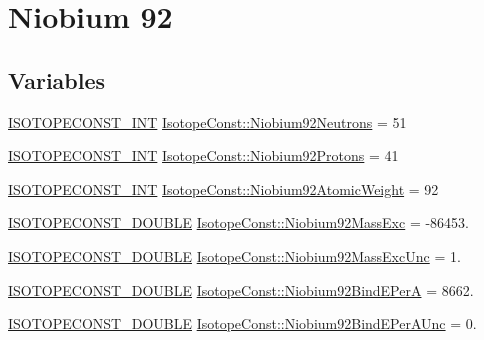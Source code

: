 \hypertarget{group___isotope_const-_niobium-_nb92}{}\section{Niobium 92}
\label{group___isotope_const-_niobium-_nb92}
\subsection*{Variables}
\begin{DoxyCompactItemize}
\item 
\mbox{\hyperlink{group___isotope_const-_macros_ga5f18360b3e99483a35c32d789e62621c}{I\+S\+O\+T\+O\+P\+E\+C\+O\+N\+S\+T\+\_\+\+I\+NT}} \mbox{\hyperlink{group___isotope_const-_niobium-_nb92_gae823fd6b9aed5c06fe87b787a26ea5b3}{Isotope\+Const\+::\+Niobium92\+Neutrons}} = 51
\item 
\mbox{\hyperlink{group___isotope_const-_macros_ga5f18360b3e99483a35c32d789e62621c}{I\+S\+O\+T\+O\+P\+E\+C\+O\+N\+S\+T\+\_\+\+I\+NT}} \mbox{\hyperlink{group___isotope_const-_niobium-_nb92_gad7fffb4b8f01187b02cffb0f05009b2e}{Isotope\+Const\+::\+Niobium92\+Protons}} = 41
\item 
\mbox{\hyperlink{group___isotope_const-_macros_ga5f18360b3e99483a35c32d789e62621c}{I\+S\+O\+T\+O\+P\+E\+C\+O\+N\+S\+T\+\_\+\+I\+NT}} \mbox{\hyperlink{group___isotope_const-_niobium-_nb92_gac2c7ddc0c0627bb86c10763f195cbb58}{Isotope\+Const\+::\+Niobium92\+Atomic\+Weight}} = 92
\item 
\mbox{\hyperlink{group___isotope_const-_macros_ga8f45a7272ce02c0b4c65c44636ed719a}{I\+S\+O\+T\+O\+P\+E\+C\+O\+N\+S\+T\+\_\+\+D\+O\+U\+B\+LE}} \mbox{\hyperlink{group___isotope_const-_niobium-_nb92_gae5d4e02b7dd29be2e12fdbabe18db7b6}{Isotope\+Const\+::\+Niobium92\+Mass\+Exc}} = -\/86453.
\item 
\mbox{\hyperlink{group___isotope_const-_macros_ga8f45a7272ce02c0b4c65c44636ed719a}{I\+S\+O\+T\+O\+P\+E\+C\+O\+N\+S\+T\+\_\+\+D\+O\+U\+B\+LE}} \mbox{\hyperlink{group___isotope_const-_niobium-_nb92_ga8323c37921056cf4e46fbcb8dea57509}{Isotope\+Const\+::\+Niobium92\+Mass\+Exc\+Unc}} = 1.
\item 
\mbox{\hyperlink{group___isotope_const-_macros_ga8f45a7272ce02c0b4c65c44636ed719a}{I\+S\+O\+T\+O\+P\+E\+C\+O\+N\+S\+T\+\_\+\+D\+O\+U\+B\+LE}} \mbox{\hyperlink{group___isotope_const-_niobium-_nb92_ga56d1f4252b27e9671246a31777623874}{Isotope\+Const\+::\+Niobium92\+Bind\+E\+PerA}} = 8662.
\item 
\mbox{\hyperlink{group___isotope_const-_macros_ga8f45a7272ce02c0b4c65c44636ed719a}{I\+S\+O\+T\+O\+P\+E\+C\+O\+N\+S\+T\+\_\+\+D\+O\+U\+B\+LE}} \mbox{\hyperlink{group___isotope_const-_niobium-_nb92_gaf5229d8e8932a1d75802195fe46524f8}{Isotope\+Const\+::\+Niobium92\+Bind\+E\+Per\+A\+Unc}} = 0.

\end{DoxyCompactItemize}
